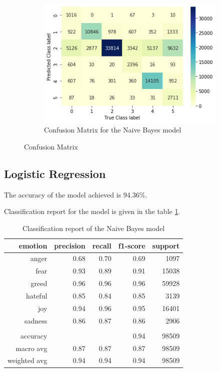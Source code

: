 \documentclass[a4paper, 12pt]{article}
\begin{document}
\begin{figure}[H]
    \centering
    \begin{subfigure}[a]{0.48\textwidth}
        \includegraphics[width=\textwidth]{res/con1.png}
        \caption{Confusion Matrix for the Naive Bayes model}
    \end{subfigure}
		\caption{Confusion Matrix}
		\label{fig:con_nb}
\end{figure}


\subsection{Logistic Regression}
The accuracy of the model achieved is 94.36\%.

Classification report for the model is given in the table \ref{tab:cr3}.

\begin{table}[h]
\begin{center}
    \begin{tabular}{| r | r | r | r | r | }
        \hline
      emotion & precision & recall & f1-score & support \\ \hline
      anger    & 0.68  & 0.70     & 0.69   		& 1097    \\ \hline
			fear		& 0.93     & 0.89     & 0.91   & 15038 \\ \hline
      greed    & 0.96     & 0.96     & 0.96   & 59928 \\ \hline
      hateful    & 0.85     & 0.84     & 0.85   & 3139 \\ \hline
      joy       & 0.94   &0.96     & 0.95    & 16401 \\ \hline
      sadness    & 0.86    & 0.87     & 0.86  & 2906  \\ \hline
									 &      &        &           &     \\ \hline
      accuracy     &   			&   		 		& 0.94  &98509    \\ \hline
      macro avg     & 0.87   &0.87        & 0.87  &98509   \\ \hline
		  weighted avg & 0.94   &0.94       & 0.94   &98509  \\ \hline
    \end{tabular}
    \caption{Classification report of the Naive Bayes model}
    \label{tab:cr3}
\end{center}
\end{table}
\end{document}
